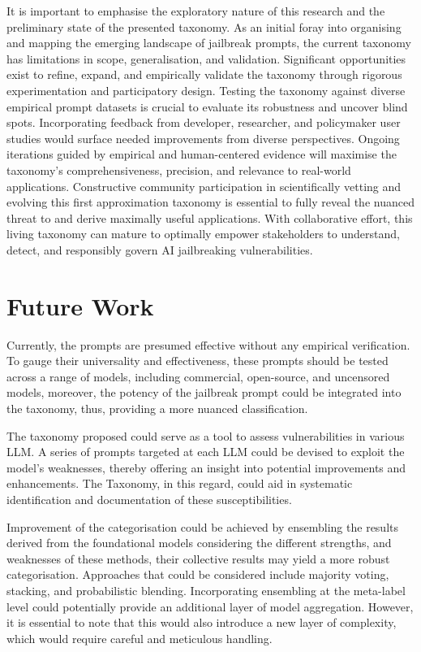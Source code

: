 \documentclass[
  letterpaper,
  DIV=11,
  numbers=noendperiod]{scrartcl}
\begin{document}
It is important to emphasise the exploratory nature of this research and
the preliminary state of the presented taxonomy. As an initial foray
into organising and mapping the emerging landscape of jailbreak prompts,
the current taxonomy has limitations in scope, generalisation, and
validation. Significant opportunities exist to refine, expand, and
empirically validate the taxonomy through rigorous experimentation and
participatory design. Testing the taxonomy against diverse empirical
prompt datasets is crucial to evaluate its robustness and uncover blind
spots. Incorporating feedback from developer, researcher, and
policymaker user studies would surface needed improvements from diverse
perspectives. Ongoing iterations guided by empirical and human-centered
evidence will maximise the taxonomy's comprehensiveness, precision, and
relevance to real-world applications. Constructive community
participation in scientifically vetting and evolving this first
approximation taxonomy is essential to fully reveal the nuanced threat
to and derive maximally useful applications. With collaborative effort,
this living taxonomy can mature to optimally empower stakeholders to
understand, detect, and responsibly govern AI jailbreaking
vulnerabilities.

\section{Future Work}\label{future-work}

Currently, the prompts are presumed effective without any empirical
verification. To gauge their universality and effectiveness, these
prompts should be tested across a range of models, including commercial,
open-source, and uncensored models, moreover, the potency of the
jailbreak prompt could be integrated into the taxonomy, thus, providing
a more nuanced classification.

The taxonomy proposed could serve as a tool to assess vulnerabilities in
various LLM. A series of prompts targeted at each LLM could be devised
to exploit the model's weaknesses, thereby offering an insight into
potential improvements and enhancements. The Taxonomy, in this regard,
could aid in systematic identification and documentation of these
susceptibilities.

Improvement of the categorisation could be achieved by ensembling the
results derived from the foundational models considering the different
strengths, and weaknesses of these methods, their collective results may
yield a more robust categorisation. Approaches that could be considered
include majority voting, stacking, and probabilistic blending.
Incorporating ensembling at the meta-label level could potentially
provide an additional layer of model aggregation. However, it is
essential to note that this would also introduce a new layer of
complexity, which would require careful and meticulous handling.
\end{document}

